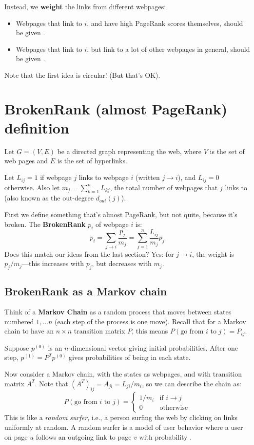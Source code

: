 \documentclass[11pt]{exam}
\begin{document}
Instead, we \textbf{weight} the links from different webpages:
\begin{itemize}
    \item Webpages that link to $i$, and have high PageRank scores themselves, should be given .
    \item Webpages that link to $i$, but link to a lot of other webpages in general, should be given .
\end{itemize}
Note that the first idea is circular! (But that's OK).

\newpage
\section{BrokenRank (almost PageRank) definition}
Let $G = (V,E)$ be a directed graph representing the web, where $V$ is the set of web pages and $E$ is the set of hyperlinks.

Let $L_{ij} = 1$ if webpage $j$ links to webpage $i$ (written $j \to i$), and $L_{ij} = 0$ otherwise. 
Also let $m_j = \sum_{k=1}^n L_{kj}$, the total number of webpages that $j$ links to (also known as the out-degree $d_{out}(j)$).

First we define something that's almost PageRank, but not quite, because it's broken. The \textbf{BrokenRank} $p_i$ of webpage $i$ is:
\[
p_i = \sum_{j \to i} \frac{p_j}{m_j} = \sum_{j=1}^n \frac{L_{ij}}{m_j} p_j
\]
Does this match our ideas from the last section? Yes: for $j \to i$, the weight is $p_j/m_j$---this increases with $p_j$, but decreases with $m_j$.

\subsection{BrokenRank as a Markov chain}
Think of a \textbf{Markov Chain} as a random process that moves between states numbered $1,\ldots n$ (each step of the process is one move).
Recall that for a Markov chain to have an $n \times n$ transition matrix $P$, this means $P(\text{go from } i \text{ to } j) = P_{ij}$.

Suppose $p^{(0)}$ is an $n$-dimensional vector giving initial probabilities. After one step, $p^{(1)} = P^T p^{(0)}$ gives probabilities of being in each state.

Now consider a Markov chain, with the states as webpages, and with transition matrix $A^T$. Note that $(A^T)_{ij} = A_{ji} = L_{ji}/m_i$, so we can describe the chain as:
\[
P(\text{go from } i \text{ to } j) = \begin{cases} 
1/m_i & \text{if } i \to j \\
0 & \text{otherwise}
\end{cases}
\]
This is like a \emph{random surfer}, i.e., a person surfing the web by clicking on links uniformly at random. A random surfer is a model of user behavior where a user on page $u$ follows an outgoing link to page $v$ with probability .
\end{document}
